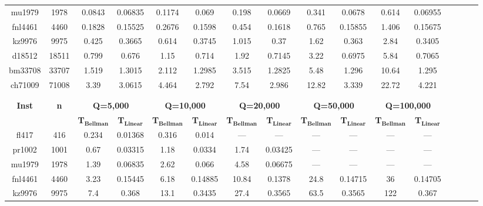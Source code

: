 \documentclass[11pt]{article}
\begin{document}
\begin{table}[p]
{\begin{tabular}{|cc|cc|cc|cc|cc|cc|cc|cc}
mu1979&1978&\num{0.0843}&\num{0.06835}&\num{0.1174}&\num{0.069}&\num{0.198}&\num{0.0669}&\num{0.341}&\num{0.0678}&\num{0.614}&\num{0.06955}\\
fnl4461&4460&\num{0.1828}&\num{0.15525}&\num{0.2676}&\num{0.1598}&\num{0.454}&\num{0.1618}&\num{0.765}&\num{0.15855}&\num{1.406}&\num{0.15675}\\
kz9976&9975&\num{0.425}&\num{0.3665}&\num{0.614}&\num{0.3745}&\num{1.015}&\num{0.37}&\num{1.62}&\num{0.363}&\num{2.84}&\num{0.3405}\\
d18512&18511&\num{0.799}&\num{0.676}&\num{1.15}&\num{0.714}&\num{1.92}&\num{0.7145}&\num{3.22}&\num{0.6975}&\num{5.84}&\num{0.7065}\\
bm33708&33707&\num{1.519}&\num{1.3015}&\num{2.112}&\num{1.2985}&\num{3.515}&\num{1.2825}&\num{5.48}&\num{1.296}&\num{10.64}&\num{1.295}\\
ch71009&71008&\num{3.39}&\num{3.0615}&\num{4.464}&\num{2.792}&\num{7.54}&\num{2.986}&\num{12.82}&\num{3.339}&\num{22.72}&\num{4.221}\\
\hline
\multicolumn{12}{c}{}\\
\multicolumn{12}{c}{\vspace*{-0.5cm}}\\
\hline
\multirow{2}{*}{\textbf{Inst}}&\multirow{2}{*}{\textbf{n}}&\multicolumn{2}{c|}{\textbf{Q=5,000}}&\multicolumn{2}{c|}{\textbf{Q=10,000}}&\multicolumn{2}{c|}{\textbf{Q=20,000}}&\multicolumn{2}{c|}{\textbf{Q=50,000}}&\multicolumn{2}{c|}{\textbf{Q=100,000}}\\
&&\textbf{T$_\textbf{Bellman}$}&\textbf{T$_\textbf{Linear}$}&\textbf{T$_\textbf{Bellman}$}&\textbf{T$_\textbf{Linear}$}&\textbf{T$_\textbf{Bellman}$}&\textbf{T$_\textbf{Linear}$}&\textbf{T$_\textbf{Bellman}$}&\textbf{T$_\textbf{Linear}$}&\textbf{T$_\textbf{Bellman}$}&\textbf{T$_\textbf{Linear}$}\\
\hline
fl417&416&\num{0.234}&\num{0.01368}&\num{0.316}&\num{0.014}&---&---&---&---&---&---\\
pr1002&1001&\num{0.67}&\num{0.03315}&\num{1.18}&\num{0.0334}&\num{1.74}&\num{0.03425}&---&---&---&---\\
mu1979&1978&\num{1.39}&\num{0.06835}&\num{2.62}&\num{0.066}&\num{4.58}&\num{0.06675}&---&---&---&---\\
fnl4461&4460&\num{3.23}&\num{0.15445}&\num{6.18}&\num{0.14885}&\num{10.84}&\num{0.1378}&\num{24.8}&\num{0.14715}&\num{36}&\num{0.14705}\\
kz9976&9975&\num{7.4}&\num{0.368}&\num{13.1}&\num{0.3435}&\num{27.4}&\num{0.3565}&\num{63.5}&\num{0.3565}&\num{122}&\num{0.367}\\

\end{tabular}}
\end{table}
\end{document}

